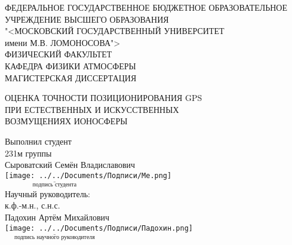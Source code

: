 \begin{titlepage}

\begin{center}
    ФЕДЕРАЛЬНОЕ ГОСУДАРСТВЕННОЕ БЮДЖЕТНОЕ ОБРАЗОВАТЕЛЬНОЕ \\
    УЧРЕЖДЕНИЕ ВЫСШЕГО ОБРАЗОВАНИЯ \\
    "<МОСКОВСКИЙ ГОСУДАРСТВЕННЫЙ УНИВЕРСИТЕТ \\
    имени М.В. ЛОМОНОСОВА"> \\[1em]
    ФИЗИЧЕСКИЙ ФАКУЛЬТЕТ \\[1em]
    КАФЕДРА ФИЗИКИ АТМОСФЕРЫ \\[2em]
    МАГИСТЕРСКАЯ ДИССЕРТАЦИЯ \\[1em]
    \begin{bfseries}
        ОЦЕНКА ТОЧНОСТИ ПОЗИЦИОНИРОВАНИЯ GPS \\ 
        ПРИ ЕСТЕСТВЕННЫХ И ИСКУССТВЕННЫХ \\
        ВОЗМУЩЕНИЯХ ИОНОСФЕРЫ \\
    \end{bfseries}
\end{center}

\vspace{2em}

\hfill\begin{minipage}{0.5\textwidth}
    \raggedleft
    Выполнил студент \\
    231м группы \\
    Сыроватский Семён Владиславович \\
    \centering\hspace{3cm}\vspace*{-0.8cm}\texttt{[image: ../../Documents/Подписи/Me.png]} \\
    \raggedleft
    $\underset{\text{подпись студента}}{\underline{\hspace{5cm}}}$ \\ [\baselineskip]
    Научный руководитель: \\
    к.ф.-м.н., с.н.с. \\ 
    Падохин Артём Михайлович \\
    \centering\hspace{3cm}\vspace*{-0.8cm}\texttt{[image: ../../Documents/Подписи/Падохин.png]} \\
    \raggedleft
    $\underset{\text{подпись научного руководителя}}{\underline{\hspace{5cm}}}$
\end{minipage}


\end{titlepage}
